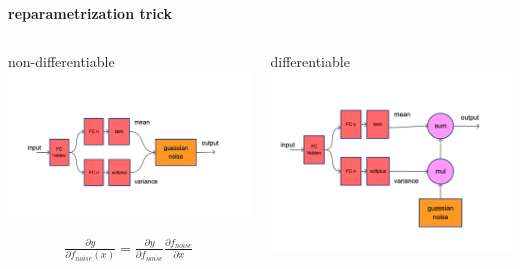 \documentclass[xcolor=dvipsnames]{beamer}
\begin{document}
\begin{frame}{\bf reparametrization trick}

   \begin{columns}[t]

    \begin{column}{0.5\textwidth}
      non-differentiable \\
      \includegraphics[scale=0.11]{../diagrams/reparametrizationtrick0.png}

      \begin{align*}
        \frac{\partial {y}}{\partial {f_{noise}(x)}} = \frac{\partial {y}}{\partial {f_{noise}}}\frac{\partial {f_{noise}}}{\partial {x}}
      \end{align*}
    \end{column}

    \begin{column}{0.5\textwidth}
      differentiable \\
      \includegraphics[scale=0.11]{../diagrams/reparametrizationtrick1.png}
    \end{column}

  \end{columns}

\end{frame}
\end{document}
